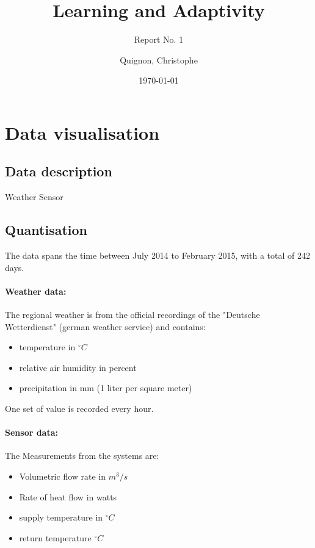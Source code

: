 \documentclass{scrartcl}
\begin{document}
\title{Learning and Adaptivity}
\subtitle{Report No. 1}
\author{
  Quignon, Christophe
}
\date{\today}


\maketitle

\section{Data visualisation}
\subsection{Data description}

Weather
Sensor

\subsection{Quantisation}
The data spans the time between July 2014 to February 2015, with a total of 242 days.

\paragraph{Weather data:}
The regional weather is from the official recordings of the "Deutsche Wetterdienst" (german weather service) and contains:

\begin{itemize}
\item temperature in $^\circ C$
\item relative air humidity in percent
\item precipitation in mm (1 liter per square meter)
\end{itemize}

One set of value is recorded every hour.

\paragraph{Sensor data:}
The Measurements from the systems are:

\begin{itemize}
\item Volumetric flow rate in $m^3 / s$
\item Rate of heat flow in watts
\item supply temperature in $^\circ C$
\item return temperature $^\circ C$
\end{itemize}
\end{document}
